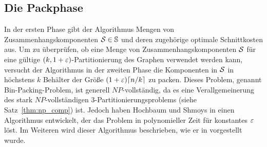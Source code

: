\subsection{Die Packphase}\label{sec:packing}
In der ersten Phase gibt der Algorithmus Mengen von Zusammenhangskomponenten $\mathcal{S} \in \mathbb{S}$ und deren zugehörige optimale Schnittkosten aus.
Um zu überprüfen, ob eine Menge von Zusammenhangskomponenten $\mathcal{S}$ für eine gültige $(k,1+\varepsilon)$\hyp Partitionierung des Graphen verwendet werden kann, versucht der Algorithmus in der zweiten Phase die Komponenten in $\mathcal{S}$ in höchstens $k$ Behälter der Größe $(1 + \eps) \ceil*{n/k}$ zu packen.
Dieses Problem, genannt Bin-Packing-Problem, ist generell $NP$\hyp vollständig, da es eine Verallgemeinerung des stark $NP$\hyp vollständigen 3\hyp Partitionierungsproblems (siehe Satz~\ref{thm:np_comp}) ist.
Jedoch haben Hochbaum und Shmoys in \parencite{hs86} einen Algorithmus entwickelt, der das Problem in polynomieller Zeit für konstantes $\varepsilon$ löst.
Im Weiteren wird dieser Algorithmus beschrieben, wie er in \parencite{hs86, va13} vorgestellt wurde.

